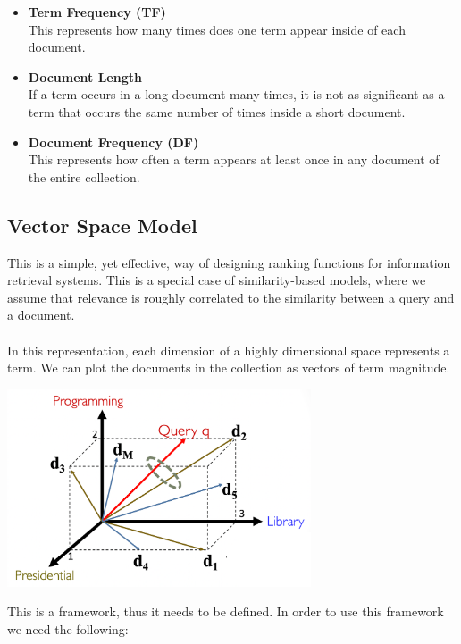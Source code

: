 \documentclass{article}
\begin{document}
\begin{itemize}
	\item \textbf{Term Frequency (TF)}
	\vspace{.2cm} \\
	This represents how many times does one term appear inside of each document.
	
	\item \textbf{Document Length}
	\vspace{.2cm} \\
	If a term occurs in a long document many times, it is not as significant as a term that occurs the same number of times inside a short document.
	
	\item \textbf{Document Frequency (DF)}
	\vspace{.2cm} \\
	This represents how often a term appears at least once in any document of the entire collection.
\end{itemize}

\subsection{Vector Space Model}
This is a simple, yet effective, way of designing ranking functions for information retrieval systems. This is a special case of similarity-based models, where we assume that relevance is roughly correlated to the similarity between a query and a document. \\ \\
In this representation, each dimension of a highly dimensional space represents a term. We can plot the documents in the collection as vectors of term magnitude.

\begin{center}
	\includegraphics[width=9cm]{vsm.png}
\end{center}
This is a framework, thus it needs to be defined. In order to use this framework we need the following:
\end{document}
